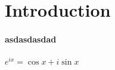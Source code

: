 \documentclass{article}
\begin{document}
\section{Introduction}

\paragraph{asdasdasdad}
\paragraph{$ e^{ix} = \cos x + i \sin x $}
\end{document}
